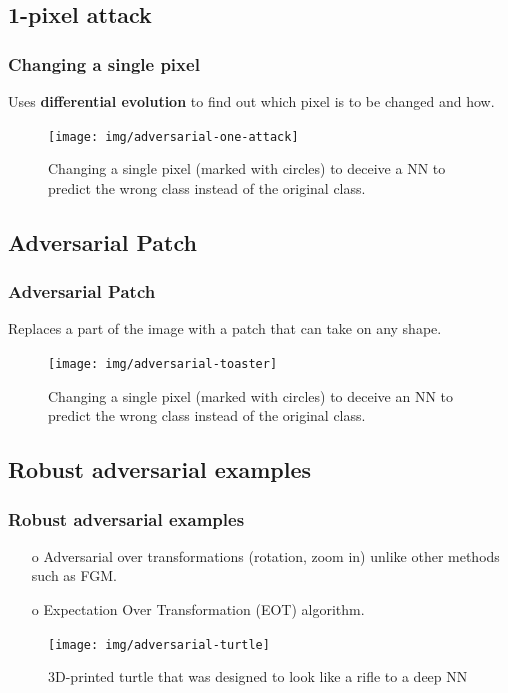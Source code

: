 \documentclass[12pt]{beamer}
\begin{document}
\subsection{1-pixel attack}
\begin{frame}
\frametitle{Changing a single pixel}
Uses \textbf{differential evolution} to find out which pixel is to be changed and how.

\begin{figure}
	\centering
	\texttt{[image: img/adversarial-one-attack]}
	\caption{Changing a single pixel (marked with circles) to deceive a NN to predict the wrong class instead of the original class.\protect\footnotemark}
	\label{fig:adversarial-1pixel}
\end{figure}


\end{frame}

\subsection{Adversarial Patch}
\begin{frame}
\frametitle{Adversarial Patch}
Replaces a part of the image with a patch that can take on any shape.

\begin{figure}
	\centering
	\texttt{[image: img/adversarial-toaster]}
	\caption{Changing a single pixel (marked with circles) to deceive an NN to predict the wrong class instead of the original class.\protect\footnotemark}
	\label{fig:adversarial-patch}
\end{figure}

\end{frame}

\subsection{Robust adversarial examples}
\begin{frame}
\frametitle{Robust adversarial examples}
\begin{itemize}
	\item[o] Adversarial over transformations (rotation, zoom in) unlike other methods such as FGM.
	\item[o] Expectation Over Transformation (EOT) algorithm.
\end{itemize}

\begin{figure}
	\centering
	\texttt{[image: img/adversarial-turtle]}
	\caption{3D-printed turtle that was designed to look like a rifle to a deep NN\protect\footnotemark}
	\label{fig:adversarial-turtle}
\end{figure}

\end{frame}
\end{document}
